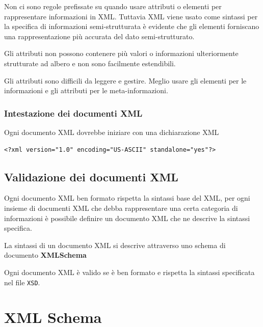 \documentclass[oneside,a4paper,11pt]{book}
\theoremstyle{italicstyle}
\theoremstyle{normStyle}
\begin{document}
Non ci sono regole prefissate su quando usare attributi o elementi per rappresentare 
informazioni in XML. Tuttavia XML viene usato come sintassi per la specifica di informazioni 
semi-strutturata è evidente che gli elementi forniscano una rappresentazione più accurata del dato semi-strutturato.

Gli attributi non possono contenere più valori o informazioni ulteriormente strutturate ad albero e non sono 
facilmente estendibili.

Gli attributi sono difficili da leggere e gestire. Meglio usare gli elementi per 
le informazioni e gli attributi per le meta-informazioni.
\subsubsection{Intestazione dei documenti XML}
Ogni documento XML dovrebbe iniziare con una dichiarazione XML
\begin{lstlisting}
<?xml version="1.0" encoding="US-ASCII" standalone="yes"?>
\end{lstlisting}
\subsection{Validazione dei documenti XML}
Ogni documento XML ben formato rispetta la sintassi base del XML, per ogni insieme 
di documenti XML che debba rappresentare una certa categoria di informazioni è possibile 
definire un documento XML che ne descrive la sintassi specifica.

La sintassi di un documento XML si descrive attraverso uno schema di documento \textbf{XMLSchema}

Ogni documento XML è valido se è ben formato e rispetta la sintassi specificata nel file \verb|XSD|.
\section{XML Schema}
\end{document}
